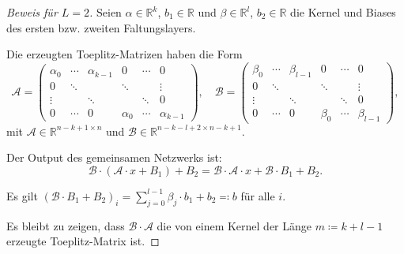 \documentclass[envcountsect, smaller, aspectratio=149]{beamer}
\newcommand{\R}{\mathbb{R}}
\begin{document}
\begin{frame}
    \begin{proof}[Beweis für $L=2$]
        Seien $\alpha\in\R^k$, $b_1\in\R$ und $\beta\in\R^l$, $b_2\in\R$ die Kernel und Biases des ersten bzw. zweiten Faltungslayers.

        \pause Die erzeugten Toeplitz-Matrizen haben die Form
        \setlength\arraycolsep{2pt}
        \def\arraystretch{0.5}
        \[
            \mathcal{A} = \left(
                \begin{matrix}
                    \alpha_0 & \cdots & \alpha_{k-1} & 0 & \cdots & 0 \\
                    0 & \ddots & & \ddots  & & \vdots \\
                    \vdots  & & \ddots & & \ddots & 0 \\[4pt]
                     0 & \cdots & 0 & \alpha_0 & \cdots & \alpha_{k-1}
                \end{matrix}
            \right),\quad
            \mathcal{B} = \left(
                \begin{matrix}
                    \beta_0 & \cdots & \beta_{l-1} & 0 & \cdots & 0 \\
                    0 & \ddots & & \ddots  & & \vdots \\
                    \vdots  & & \ddots & & \ddots & 0 \\[4pt]
                     0 & \cdots & 0 & \beta_0 & \cdots & \beta_{l-1}
                \end{matrix}
            \right),
        \]
        mit $\mathcal{A}\in\R^{n - k + 1\times n}$ und $\mathcal{B}\in \R^{n-k-l+2 \times n-k+1}$.

        \pause Der Output des gemeinsamen Netzwerks ist:
        \[
            \mathcal{B}\cdot \left( \mathcal{A}\cdot x + B_1 \right) + B_2
            = \mathcal{B}\cdot \mathcal{A}\cdot x + \mathcal{B}\cdot B_1 + B_2.
        \]

        \pause Es gilt $(\mathcal{B}\cdot B_1 + B_2)_i = \sum_{j=0}^{l-1} \beta_j\cdot b_1 + b_2 \eqqcolon b$ für alle $i$.
        
        \pause Es bleibt zu zeigen, dass $\mathcal{B}\cdot \mathcal{A}$ die von einem Kernel der Länge $m\coloneqq k+l-1$ erzeugte Toeplitz-Matrix ist. 

        \renewcommand{\qedsymbol}{}
    \end{proof}
\end{frame}
\end{document}
